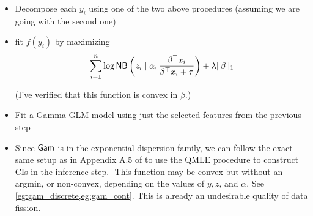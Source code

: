 \begin{itemize}
\item Decompose each $y_i$ using one of the two above procedures (assuming we are going with the second one)

\item fit $f(y_i)$ by maximizing
\[
\sum_{i=1}^n \log {\sf{NB}}\left(z_i \mid \alpha, \frac{\beta^\top x_i}{\beta^\top x_i+\tau}\right) + \lambda \|\beta\|_1
\]

(I've verified that this function is convex in $\beta$.)

\item Fit a Gamma GLM model using just the selected features from the previous step

\item Since ${\sf{Gam}}$ is in the exponential dispersion family, we can follow the exact same setup as in Appendix A.5 of \cite{leiner2022data} to use the QMLE procedure to construct CIs in the inference step.
\newline$ $
\color{red}
This function may be convex but without an argmin, or non-convex, depending on the values of $y, z$, and $\alpha$. See \cref{eg:gam_discrete,eg:gam_cont}. This is already an undesirable quality of data fission.
\color{black}

\end{itemize}

